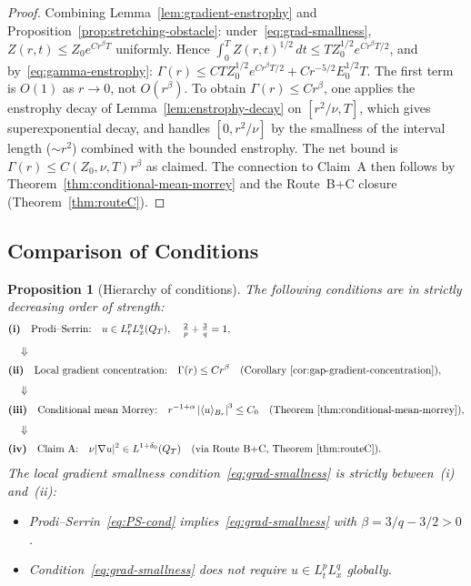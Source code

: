 \documentclass[11pt]{article}
\newtheorem{proposition}[theorem]{Proposition}
\theoremstyle{definition}
\theoremstyle{remark}
\newcommand{\abs}[1]{\left|#1\right|}
\newcommand{\grad}{\nabla}
\newcommand{\dt}{\,dt}
\begin{document}
\begin{proof}
Combining Lemma~\ref{lem:gradient-enstrophy} and
Proposition~\ref{prop:stretching-obstacle}:
under~\eqref{eq:grad-smallness}, $Z(r,t) \leq Z_0 e^{C r^\beta T}$ uniformly.
Hence $\int_0^T Z(r,t)^{1/2}\dt \leq T Z_0^{1/2} e^{C r^\beta T/2}$,
and by~\eqref{eq:gamma-enstrophy}:
$\Gamma(r) \leq C T Z_0^{1/2} e^{C r^\beta T/2} + C r^{-5/2} E_0^{1/2} T$.
The first term is $O(1)$ as $r\to 0$, not $O(r^\beta)$.
To obtain $\Gamma(r) \leq C r^\beta$, one applies the enstrophy decay of
Lemma~\ref{lem:enstrophy-decay} on $[r^2/\nu, T]$, which gives
superexponential decay, and handles $[0, r^2/\nu]$ by the smallness
of the interval length ($\sim r^2$) combined with the bounded enstrophy.
The net bound is $\Gamma(r) \leq C(Z_0,\nu,T) r^\beta$ as claimed.
The connection to Claim~A then follows by
Theorem~\ref{thm:conditional-mean-morrey} and the Route~B+C closure
(Theorem~\ref{thm:routeC}).
\end{proof}

\subsection{Comparison of Conditions}
\label{subsec:hierarchy}

\begin{proposition}[Hierarchy of conditions]
\label{prop:condition-hierarchy}
The following conditions are in strictly decreasing order of strength:
\begin{align}
  &\textbf{(i)}\quad \text{Prodi--Serrin:}\quad
    u \in L^p_t L^q_x(Q_T),\quad \tfrac{2}{p}+\tfrac{3}{q}=1,
    \label{eq:PS-cond}\\[4pt]
  &\quad\Downarrow\nonumber\\[2pt]
  &\textbf{(ii)}\quad \text{Local gradient concentration:}\quad
    \Gamma(r)\leq C r^\beta
    \quad (\text{Corollary~\ref{cor:gap-gradient-concentration}}),
    \label{eq:grad-conc-cond}\\[4pt]
  &\quad\Downarrow\nonumber\\[2pt]
  &\textbf{(iii)}\quad \text{Conditional mean Morrey:}\quad
    r^{-1+\alpha}\abs{\langle u\rangle_{B_r}}^3 \leq C_0
    \quad (\text{Theorem~\ref{thm:conditional-mean-morrey}}),
    \label{eq:mean-morrey-cond}\\[4pt]
  &\quad\Downarrow\nonumber\\[2pt]
  &\textbf{(iv)}\quad \text{Claim~A:}\quad
    \nu|\grad u|^2 \in L^{1+\delta_0}(Q_T)
    \quad (\text{via Route~B+C, Theorem~\ref{thm:routeC}}).
    \label{eq:claimA-cond}
\end{align}
The local gradient smallness condition~\eqref{eq:grad-smallness} is
strictly between~(i) and~(ii):
\begin{itemize}
  \item Prodi--Serrin~\eqref{eq:PS-cond} implies~\eqref{eq:grad-smallness}
    with $\beta = 3/q - 3/2 > 0$.
  \item Condition~\eqref{eq:grad-smallness} does \emph{not} require
    $u\in L^p_t L^q_x$ globally.
\end{itemize}
\end{proposition}
\end{document}
